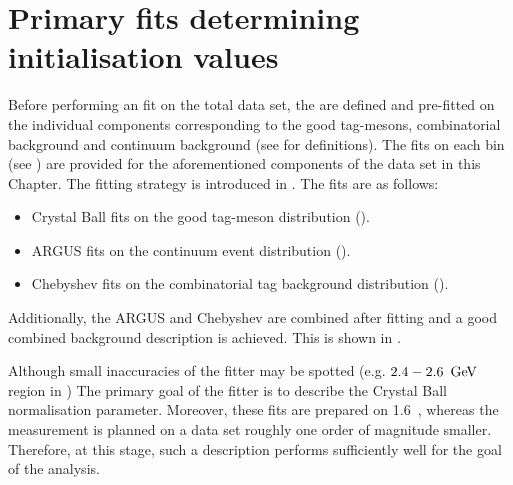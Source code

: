 \chapter{Primary \texorpdfstring{\Mbc}{Mbc} fits determining initialisation values}\label{sec:appendix_primary_fits}
Before performing an \Mbc fit on the total data set, the  are defined and pre-fitted on the individual components corresponding to the good tag-\B mesons, combinatorial \BB background and continuum background (see  for definitions).
The \Mbc fits on each \EB bin (see ) are provided for the aforementioned components of the data set in this Chapter.
The fitting strategy is introduced in .
The fits are as follows:
\begin{itemize}
    \item Crystal Ball \PDF fits on the good tag-\B meson \Mbc distribution ().
    \item ARGUS \PDF fits on the continuum event \Mbc distribution ().
    \item Chebyshev \PDF fits on the combinatorial \BB tag background distribution ().
\end{itemize}
Additionally, the ARGUS and Chebyshev  are combined after fitting and a good combined background description is achieved.
This is shown in  .

Although small inaccuracies of the fitter may be spotted (e.g. $2.4-2.6~\mathrm{\,Ge\kern -0.1em V}$ region in ) The primary goal of the fitter is to describe the Crystal Ball normalisation parameter.
Moreover, these fits are prepared on 1.6~\invab, whereas the measurement is planned on a data set roughly one order of magnitude smaller.
Therefore, at this stage, such a description performs sufficiently well for the goal of the analysis.

